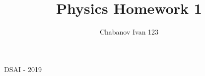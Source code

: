 

\begin{titlepage}
    \title{Physics Homework 1}
    \author{Chabanov Ivan 123}
    \maketitle
    DSAI - 2019


\end{titlepage}